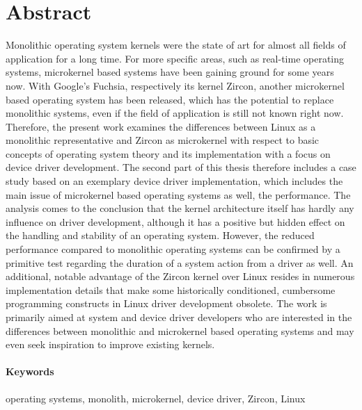 \section*{Abstract}
Monolithic operating system kernels were the state of art for almost all fields of application for a long time.
For more specific areas, such as real-time operating systems, microkernel based systems have been gaining ground for some years now.
With Google's Fuchsia, respectively its kernel Zircon, another microkernel based operating system has been released, which has the potential to replace monolithic systems, even if the field of application is still not known right now.
Therefore, the present work examines the differences between Linux as a monolithic representative and Zircon as microkernel with respect to basic concepts of operating system theory and its implementation with a focus on device driver development.
The second part of this thesis therefore includes a case study based on an exemplary device driver implementation, which includes the main issue of microkernel based operating systems as well, the performance.
The analysis comes to the conclusion that the kernel architecture itself has hardly any influence on driver development, although it has a positive but hidden effect on the handling and stability of an operating system.
However, the reduced performance compared to monolithic operating systems can be confirmed by a primitive test regarding the duration of a system action from a driver as well.
An additional, notable advantage of the Zircon kernel over Linux resides in numerous implementation details that make some historically conditioned, cumbersome programming constructs in Linux driver development obsolete.
The work is primarily aimed at system and device driver developers who are interested in the differences between monolithic and microkernel based operating systems and may even seek inspiration to improve existing kernels.

\paragraph{Keywords} operating systems, monolith, microkernel, device driver, Zircon, Linux


